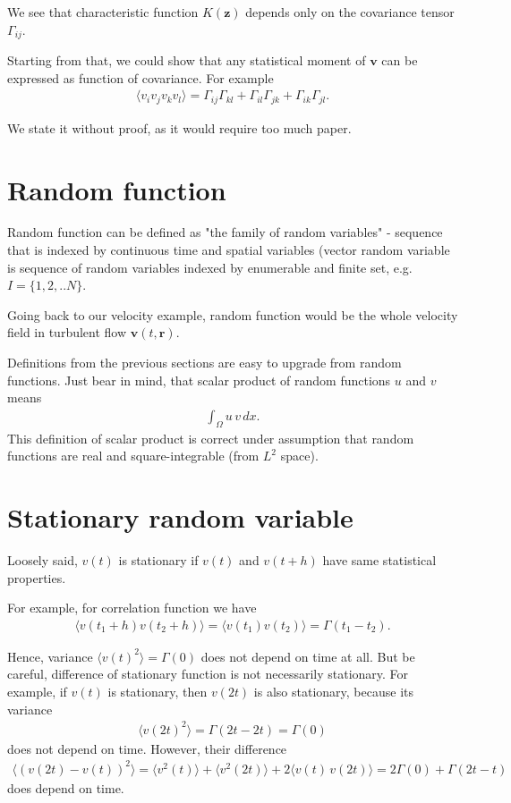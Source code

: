 {We see that characteristic function $K(\bm{z})$ depends only on the covariance tensor $\Gamma_{ij}$.

\bigskip


Starting from that, we could show that any statistical moment of $\bm{v}$ can be expressed as function of covariance. For example
\begin{align}
\langle v_i v_j v_k v_l \rangle = \Gamma_{ij}\Gamma_{kl} + \Gamma_{il}\Gamma_{jk} + \Gamma_{ik}\Gamma_{jl}.
\end{align}

We state it without proof, as it would require too much paper.

\section{Random function}
Random function can be defined as "the family of random variables" - sequence that is indexed by continuous time and spatial variables (vector random variable is sequence of random variables indexed by enumerable and finite set, e.g. $I=\big\{1,2,..N\big\}$.

Going back to our velocity example, random function would be the whole velocity field in turbulent flow
$\bm{v}(t,\bm{r})$.

\bigskip

Definitions from the previous sections are easy to upgrade from random functions.
Just bear in mind, that scalar product of random functions $u$ and $v$ means
\begin{align}
\int_{\Omega} u \, v \, dx.
\end{align}
This definition of scalar product is correct under assumption that random functions are real and square-integrable (from $L^2$ space).


\section{Stationary random variable}
Loosely said, $v(t)$ is stationary if $v(t)$ and $v(t+h)$ have same statistical properties.

For example, for correlation function we have
\begin{align}
\langle v(t_1+h) v(t_2 + h) \rangle = \langle v(t_1) v(t_2) \rangle = \Gamma(t_1 - t_2).
\end{align}

Hence, variance $\langle v(t)^2 \rangle = \Gamma(0)$ does not depend on time at all.
But be careful, difference of stationary function is not necessarily stationary. 
For example, if $v(t)$ is stationary, then $v(2t)$ is also stationary, because its variance
\begin{align}
\langle v(2t)^2 \rangle = \Gamma(2t - 2t) = \Gamma(0)
\end{align}
does not depend on time.
However, their difference
\begin{align}
\langle (v(2t) - v(t))^2 \rangle = \langle v^2(t) \rangle + \langle v^2(2t) \rangle + 2\langle v(t)\,v(2t) \rangle = 2\Gamma(0) + \Gamma(2t - t)
\end{align} 
does depend on time.

}
